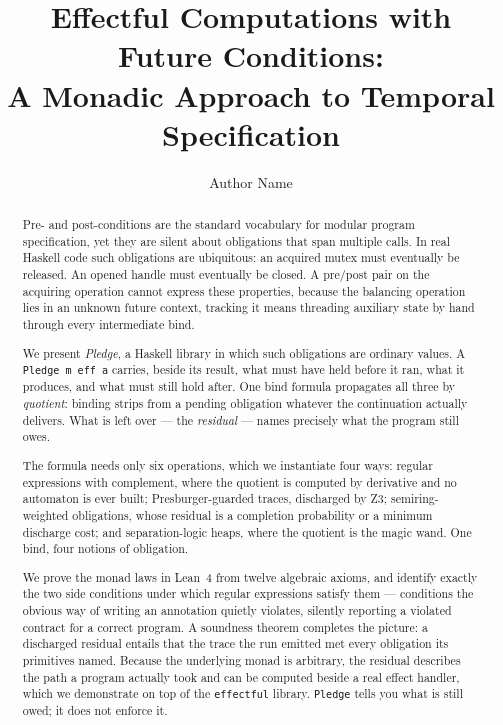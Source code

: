 \documentclass[acmsmall,screen]{acmart}
\begin{document}
\title{Effectful Computations with Future Conditions:\texorpdfstring{\\}{}
       A Monadic Approach to Temporal Specification}

\author{Author Name}

\begin{abstract}
Pre- and post-conditions are the standard vocabulary for modular program specification, yet they are silent about obligations that span multiple calls.
In real Haskell code such obligations are ubiquitous: an acquired mutex must eventually be released.
An opened handle must eventually be closed.
A pre/post pair on the acquiring operation cannot express these properties,
because the balancing operation lies in an unknown future context, tracking it means
threading auxiliary state by hand through every intermediate bind.

We present \emph{Pledge}, a Haskell library in which such obligations are
ordinary values.
A \lstinline{Pledge m eff a} carries, beside its result, what must have held
before it ran, what it produces, and what must still hold after.
One bind formula propagates all three by \emph{quotient}: binding strips
from a pending obligation whatever the continuation actually delivers.
What is left over --- the \emph{residual} --- names precisely what the
program still owes.

The formula needs only six operations, which we instantiate four ways:
regular expressions with complement, where the quotient is computed by
derivative and no automaton is ever built;
Presburger-guarded traces, discharged by Z3;
semiring-weighted obligations, whose residual is a completion probability
or a minimum discharge cost;
and separation-logic heaps, where the quotient is the magic wand.
One bind, four notions of obligation.

We prove the monad laws in Lean~4 from twelve algebraic axioms, and
identify exactly the two side conditions under which regular expressions
satisfy them --- conditions the obvious way of writing an annotation
quietly violates, silently reporting a violated contract for a correct
program.
A soundness theorem completes the picture: a discharged residual entails
that the trace the run emitted met every obligation its primitives named.
Because the underlying monad is arbitrary, the residual describes the path
a program actually took and can be computed beside a real effect handler,
which we demonstrate on top of the \lstinline{effectful} library.
\lstinline{Pledge} tells you what is still owed; it does not enforce it.
\end{abstract}
\end{document}
